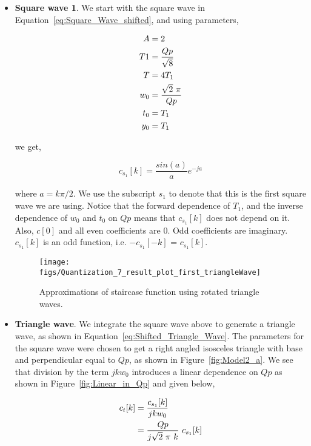 \documentclass[12pt]{article}
\begin{document}
\begin{itemize}
\item \textbf{Square wave 1}.  We start with the square wave in Equation~\ref{eq:Square_Wave_shifted}, and using parameters, %

		\begin{align}
		\label{eq:Parameter_values_1}
		A		&=	2\notag\\
		T1	&=	\frac{Qp}{\sqrt{8}}\notag\\ 
		T		&=	4T_1\notag\\
		w_0	&=	\frac{\sqrt{2} \  \pi}{Qp}\notag\\ 
		t_0	&=	T_1\\
		y_0	&=	T_1\notag
		\end{align}	
		
we get,
	
		\begin{equation}
		c_{s_1}[k] = \frac{sin(a)}{a}e^{-ja}
		\label{eq:Square_1_ck}
		\end{equation}
		
where $a=k\pi/2$.  We use the subscript $s_1$ to denote that this is the first square wave we are using.  Notice that the forward dependence of $T_1$, and the inverse dependence of $w_0$ and $t_0$ on $Qp$ means that $c_{s_1}[k]$ does not depend on it.  Also, $c[0]$ and all even coefficients are $0$.  Odd coefficients are imaginary.  $c_{s_1}[k]$ is an odd function, i.e.  $-c_{s_1}[-k]$ = $c_{s_1}[k]$.

		\begin{figure}
		\centering
		\texttt{[image: figs/Quantization\_7\_result\_plot\_first\_triangleWave]}		
		\caption{Approximations of staircase function using rotated triangle waves.}
		\label{fig:Creating_model_2} 		
    \end{figure} 
    
\item \textbf{Triangle wave}.  We integrate the square wave above to generate a triangle wave, as shown in Equation~\ref{eq:Shifted_Triangle_Wave}.  The parameters for the square wave were chosen to get a right angled isosceles triangle with base and perpendicular equal to $Qp$, as shown in Figure~\ref{fig:Model2_a}.  We see that division by the term $jkw_0$ introduces a linear dependence on $Qp$ as shown in Figure~\ref{fig:Linear_in_Qp} and given below,

		\begin{align}
		c_t[k] &= \frac{c_{s_1}[k]}{jkw_0}\notag\\
		       & =  \frac{Qp}{j \sqrt{2} \ \pi \ k}  \ c_{s_1}[k]
		\label{eq:Triangle_1_ck}
		\end{align}
		

\end{itemize}
\end{document}
